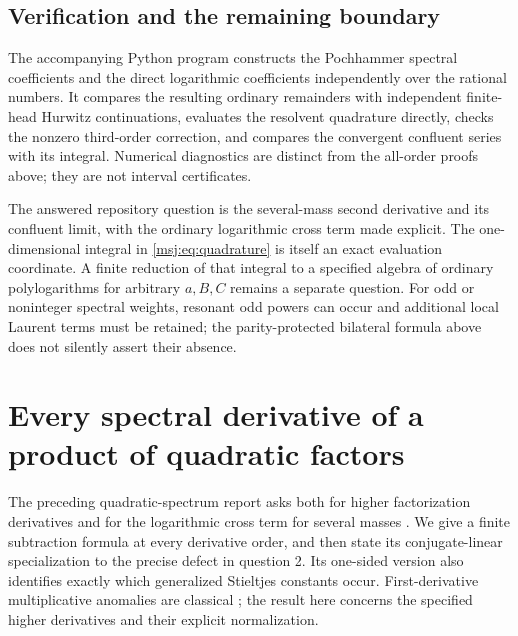 \documentclass[11pt,a4paper]{article}
\numberwithin{equation}{section}
\theoremstyle{plain}
\theoremstyle{definition}
\theoremstyle{remark}
\begin{document}
\subsection{Verification and the remaining boundary}

The accompanying Python program constructs the Pochhammer spectral
coefficients and the direct logarithmic coefficients independently over
the rational numbers. It compares the resulting ordinary remainders
with independent finite-head Hurwitz continuations, evaluates the
resolvent quadrature directly, checks the nonzero third-order correction,
and compares the convergent confluent series with its integral.
Numerical diagnostics are distinct from the all-order proofs above;
they are not interval certificates.

The answered repository question is the several-mass second derivative
and its confluent limit, with the ordinary logarithmic cross term made
explicit. The one-dimensional integral in \eqref{msj:eq:quadrature}
is itself an exact evaluation coordinate. A finite reduction of that
integral to a specified algebra of ordinary polylogarithms for arbitrary
$a,B,C$ remains a separate question. For odd or noninteger spectral
weights, resonant odd powers can occur and additional local Laurent
terms must be retained; the parity-protected bilateral formula above
does not silently assert their absence.



\section{Every spectral derivative of a product of quadratic factors}
\label{sec:onesided}

The preceding quadratic-spectrum report asks both for higher factorization
derivatives and for the logarithmic cross term for several masses
\cite[Section 7, questions 2 and 7]{Quadratic}.  We give a finite
subtraction formula at every derivative order, and then state its
conjugate-linear specialization to the precise defect in question 2.
Its one-sided version
also identifies exactly which generalized Stieltjes constants occur.
First-derivative multiplicative anomalies are classical
\cite{EVZ,PolynomialAnomaly}; the result here concerns the specified
higher derivatives and their explicit normalization.
\end{document}
